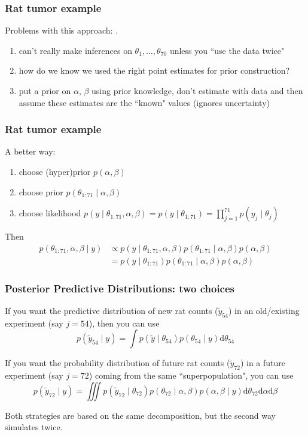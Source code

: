 \documentclass{beamer}
\begin{document}
\begin{frame}
\frametitle{Rat tumor example}

Problems with this approach: .

\begin{enumerate}
\item can't really make inferences on $\theta_1, \ldots, \theta_{70}$ unless you ``use the data twice"
\item how do we know we used the right point estimates for prior construction?
\item put a prior on $\alpha$, $\beta$ using prior knowledge, don't estimate with data and then assume these estimates are the ``known" values (ignores uncertainty)
\end{enumerate}


\end{frame}

\begin{frame}
\frametitle{Rat tumor example}

A better way:
\begin{enumerate}
\item choose (hyper)prior $p(\alpha,\beta)$ 
\item choose prior $p(\theta_{1:71} \mid \alpha, \beta)$
\item choose likelihood $p(y \mid \theta_{1:71}, \alpha, \beta) = p(y \mid \theta_{1:71}) = \prod_{j=1}^{71}p(y_j \mid \theta_{j})$
\end{enumerate}

Then 
\begin{align*}
p(\theta_{1:71}, \alpha, \beta \mid y) &\propto p(y \mid \theta_{1:71}, \alpha, \beta)p(\theta_{1:71} \mid \alpha,\beta)p(\alpha,\beta) \tag{Bayes'} \\
&= p(y \mid \theta_{1:71} )p(\theta_{1:71} \mid \alpha, \beta)p(\alpha,\beta) \tag{condtl. indep.} 
\end{align*}


\end{frame}


\begin{frame}
\frametitle{Posterior Predictive Distributions: two choices}

If you want the predictive distribution of new rat counts ($\tilde{y}_{54}$) in an old/existing experiment (say $j=54$), then you can use
\[
p(\tilde{y}_{54} \mid y) = \int p(\tilde{y} \mid \theta_{54})p(\theta_{54} \mid y) \text{d}\theta_{54}
\]

If you want the probability distribution of future rat counts ($\tilde{y}_{72}$) in a future experiment (say $j=72$) coming from the same ``superpopulation", you can use
\[
p(\tilde{y}_{72} \mid y) = \iiint p(\tilde{y}_{72} \mid \theta_{72})p(\theta_{72} \mid \alpha, \beta)p(\alpha,\beta \mid y) \text{d}\theta_{72}\text{d}\alpha \text{d}\beta
\]

Both strategies are based on the same decomposition, but the second way simulates twice.
\end{frame}
\end{document}
